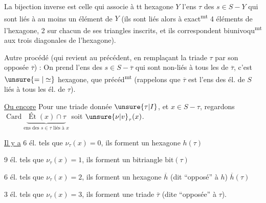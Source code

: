 La bijection inverse est celle qui associe à tt hexagone $Y$ l'ens $\tau$ des $s\in S-Y$ qui sont liés à au moins un élément de $Y$ (ils sont liés alors à exact\textsuperscript{mt} 4 éléments  de l'hexagone, 2 sur chacun de ses triangles inscrits, et ils correspondent biunivoqu\textsuperscript{mt} aux trois diagonales de l'hexagone).

Autre procédé (qui revient au précédent, en remplaçant la triade $\tau$ par son opposée $\overline\tau$) : On prend l'ens des $s\in S-\overline\tau$ qui sont non-liés à tous les  de $\overline\tau$,  c'est   $\unsure{=|\simeq}$ hexagone,  que précéd\textsuperscript{mt} (rappelons que $\overline\tau$ est l'ens des él. de $S$ liés à tous les él. de $\tau$).

\uline{Ou encore} Pour une triade donnée $\unsure{\tau|I}$, et $x\in S-\tau$, regardons  $\operatorname{Card}\underbrace{\operatorname{Ét}(x)\cap\tau}_{\text{ens des }s\in\tau\text{ liés à }x}$ \unsure{,|]} soit $\unsure{\nu|v}_\tau(x)$.

\uline{Il y a} 6 él. tels que $\nu_\tau(x)=0$, ils forment un hexagone $h(\tau)$

9 él. tels que $\nu_\tau(x)=1$, ils forment un bitriangle $\mathrm{bit}(\tau)$

6 él. tels que $\nu_\tau(x)=2$, ils forment un hexagone $\overline h$ (dit ``opposé'' à $h$) $\overline h(\tau)$

3 él. tels que $\nu_\tau(x)=3$, ils forment une triade $\overline\tau$ (dite ``opposée'' à $\tau$).


